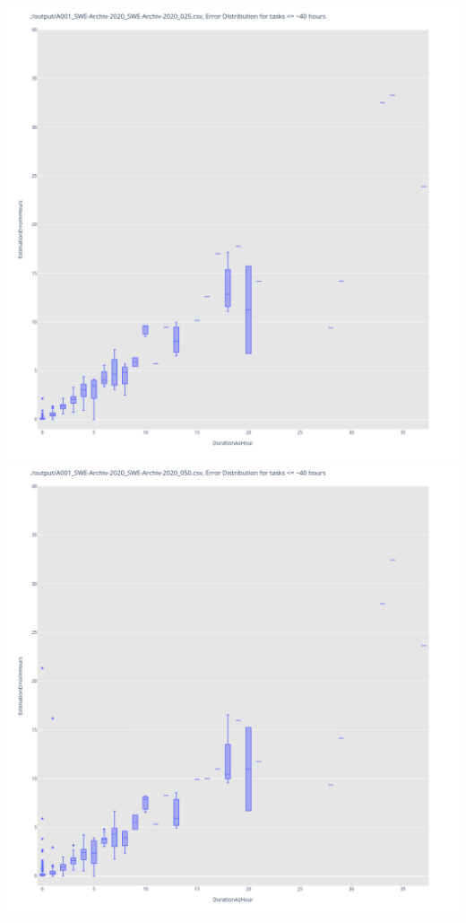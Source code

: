 \includegraphics[width=\textwidth]{Scripts/output/A001_SWE-Archiv-2020_SWE-Archiv-2020_025.csv.error_distribution.png}
\includegraphics[width=\textwidth]{Scripts/output/A001_SWE-Archiv-2020_SWE-Archiv-2020_050.csv.error_distribution.png}
